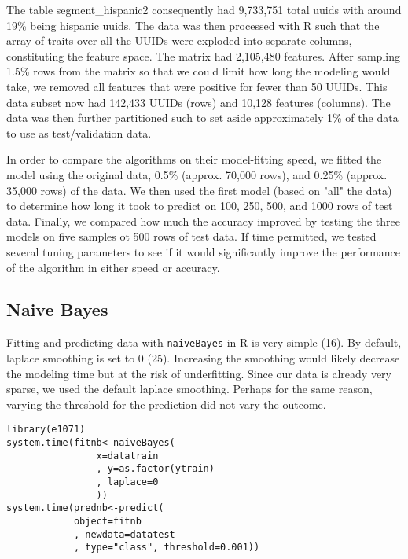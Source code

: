 \documentclass[a4paper]{article}
\begin{document}
\begin{multicols}{2}
The table segment\_hispanic2 consequently had 9,733,751 total uuids with around 19\% being hispanic uuids. The data was then processed with R such that the array of traits over all the UUIDs were exploded into separate columns, constituting the feature space. The matrix had 2,105,480 features. After sampling 1.5\% rows from the matrix so that we could limit how long the modeling would take, we removed all features  that were positive for fewer than 50 UUIDs. This data subset now had 142,433 UUIDs (rows) and 10,128 features (columns). The data was then further partitioned such to set aside approximately 1\% of the data to use as test/validation data.

In order to compare the algorithms on their model-fitting speed, we fitted the model using the original data, 0.5\% (approx. 70,000 rows), and 0.25\% (approx. 35,000 rows) of the data. We then used the first model (based on "all" the data) to determine how long it took to predict on 100, 250, 500, and 1000 rows of test data. Finally, we compared how much the accuracy improved by testing the three models on five samples ot 500 rows of test data. If time permitted, we tested several tuning parameters to see if it would significantly improve the performance of the algorithm in either speed or accuracy.

\subsection*{Naive Bayes}
Fitting and predicting data with \texttt{naiveBayes} in R is very simple (16). By default, laplace smoothing is set to 0 (25). Increasing the smoothing would likely decrease the modeling time but at the risk of underfitting. Since our data is already very sparse, we used the default laplace smoothing. Perhaps for the same reason, varying the threshold for the prediction did not vary the outcome.
\begin{verbatim}
library(e1071)
system.time(fitnb<-naiveBayes(
                x=datatrain
                , y=as.factor(ytrain)
                , laplace=0
                ))
system.time(prednb<-predict(
            object=fitnb
            , newdata=datatest
            , type="class", threshold=0.001))
\end{verbatim}


\end{multicols}
\end{document}
